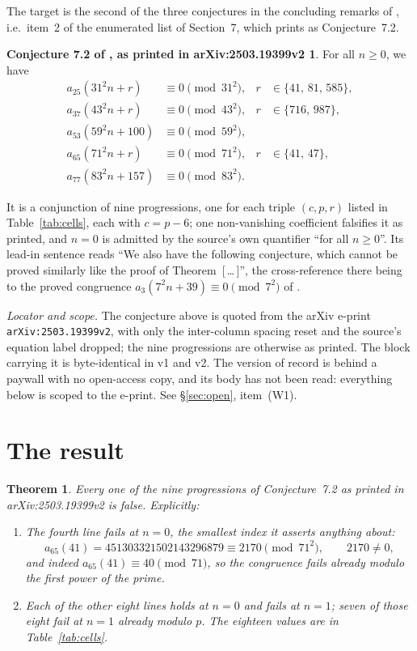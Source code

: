\documentclass[11pt]{amsart}
\newtheorem{theorem}{Theorem}
\theoremstyle{definition}
\newtheorem*{conjecture}{Conjecture 7.2 of \cite{DMS}, as printed in arXiv:2503.19399v2}
\theoremstyle{remark}
\begin{document}
The target is the second of the three conjectures in the concluding remarks of \cite{DMS},
i.e.\ item~2 of the enumerated list of Section~7, which prints as Conjecture~7.2.

\begin{conjecture}
For all $n\ge0$, we have
\begin{align*}
 a_{25}(31^2n+r)&\equiv 0 \pmod{31^2}, & r&\in\{41,\,81,\,585\},\\
 a_{37}(43^2n+r)&\equiv 0 \pmod{43^2}, & r&\in\{716,\,987\},\\
 a_{53}(59^2n+100)&\equiv 0 \pmod{59^2},\\
 a_{65}(71^2n+r)&\equiv 0 \pmod{71^2}, & r&\in\{41,\,47\},\\
 a_{77}(83^2n+157)&\equiv 0 \pmod{83^2}.
\end{align*}
\end{conjecture}

\noindent
It is a conjunction of nine progressions, one for each triple $(c,p,r)$ listed in
Table~\ref{tab:cells}, each with $c=p-6$; one non-vanishing coefficient falsifies it as
printed, and $n=0$ is
admitted by the source's own quantifier ``for all $n\ge0$''. Its lead-in sentence reads
``We also have the following conjecture, which cannot be proved similarly like the proof of
Theorem~[\,\ldots\,]'', the cross-reference there being to the proved congruence
$a_3(7^2n+39)\equiv0\pmod{7^2}$ of \cite{DMS}.

\emph{Locator and scope.} The conjecture above is quoted from the arXiv e-print
\texttt{arXiv:2503.19399v2}, with only the inter-column spacing reset and the source's
equation label dropped; the nine progressions are otherwise as printed. The block carrying
it is byte-identical in v1 and v2. The version of record is behind a paywall with no
open-access copy, and its body has not been read: everything below is scoped to the
e-print. See \S\ref{sec:open}, item~(W1).

\section{The result}

\begin{theorem}\label{thm:main}
Every one of the nine progressions of Conjecture~7.2 as printed in arXiv:2503.19399v2 is
false. Explicitly:
\begin{enumerate}
\item[(i)] The fourth line fails at $n=0$, the smallest index it asserts anything about:
\begin{equation}\label{eq:witness}
 a_{65}(41)=451303321502143296879\equiv 2170 \pmod{71^2},\qquad 2170\ne0 ,
\end{equation}
and indeed $a_{65}(41)\equiv 40\pmod{71}$, so the congruence fails already modulo the
first power of the prime.
\item[(ii)] Each of the other eight lines holds at $n=0$ and fails at $n=1$; seven of
those eight fail at $n=1$ already modulo $p$. The eighteen values are in
Table~\ref{tab:cells}.
\end{enumerate}
\end{theorem}
\end{document}

